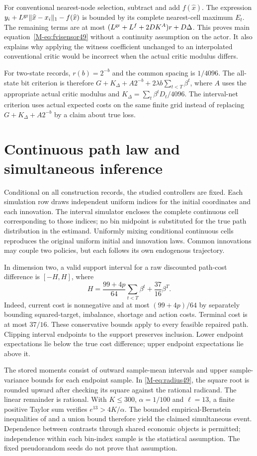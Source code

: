 \documentclass[ecta,nameyear,draft]{econsocart}
\begin{document}
For conventional nearest-node selection, subtract and add $f(\widehat x)$. The expression $y_i+L^{\rm gr}\|\widehat x-x_i\|_1-f(\widehat x)$ is bounded by its complete nearest-cell maximum $E_t$. The remaining terms are at most $(L^{\rm gr}+L^f+2DK^A)r+D\Delta$. This proves main equation~\eqref{M-eq:fvisensor49} without a continuity assumption on the actor. It also explains why applying the witness coefficient unchanged to an interpolated conventional critic would be incorrect when the actual critic modulus differs.

For two-state records, $r(b)=2^{-b}$ and the common spacing is $1/4096$. The all-state bit criterion is therefore $G+K_\Delta+A2^{-b}+2\lambda b\sum_{t<T}\beta^t$, where $A$ uses the appropriate actual critic modulus and $K_\Delta=\sum_t\beta^tD_t/4096$. The interval-net criterion uses actual expected costs on the same finite grid instead of replacing $G+K_\Delta+A2^{-b}$ by a claim about true loss.

\section{Continuous path law and simultaneous inference}\label{supp:inference49}
Conditional on all construction records, the studied controllers are fixed. Each simulation row draws independent uniform indices for the initial coordinates and each innovation. The interval simulator encloses the complete continuous cell corresponding to those indices; no bin midpoint is substituted for the true path distribution in the estimand. Uniformly mixing conditional continuous cells reproduces the original uniform initial and innovation laws. Common innovations may couple two policies, but each follows its own endogenous trajectory.

In dimension two, a valid support interval for a raw discounted path-cost difference is $[-H,H]$, where
\[
 H=\frac{99+4p}{64}\sum_{t<T}\beta^t+\frac{37}{16}\beta^T.
\]
Indeed, current cost is nonnegative and at most $(99+4p)/64$ by separately bounding squared-target, imbalance, shortage and action costs. Terminal cost is at most $37/16$. These conservative bounds apply to every feasible repaired path. Clipping interval endpoints to the support preserves inclusion. Lower endpoint expectations lie below the true cost difference; upper endpoint expectations lie above it.

The stored moments consist of outward sample-mean intervals and upper sample-variance bounds for each endpoint sample. In \eqref{M-eq:radius49}, the square root is rounded upward after checking its square against the rational radicand. The linear remainder is rational. With $K\le300$, $\alpha=1/100$ and $\ell=13$, a finite positive Taylor sum verifies $e^{13}>4K/\alpha$. The bounded empirical-Bernstein inequalities of \citet{maurer2009} and a union bound therefore yield the claimed simultaneous event. Dependence between contrasts through shared economic objects is permitted; independence within each bin-index sample is the statistical assumption. The fixed pseudorandom seeds do not prove that assumption.
\end{document}

